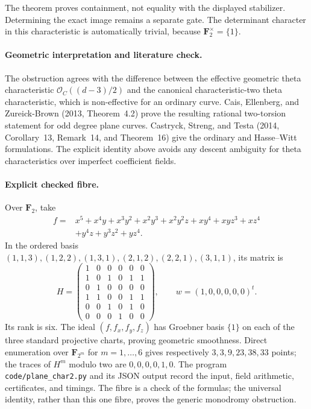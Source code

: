 The theorem proves containment, not equality with the displayed
stabilizer.  Determining the exact image remains a separate gate.
The determinant character in this characteristic is automatically
trivial, because $\mathbf F_2^\times=\{1\}$.

\paragraph{Geometric interpretation and literature check.}
The obstruction agrees with the difference between the effective
geometric theta characteristic
$\mathcal O_C((d-3)/2)$ and the canonical characteristic-two theta
characteristic, which is non-effective for an ordinary curve.
Cais, Ellenberg, and Zureick-Brown (2013, Theorem~4.2) prove the resulting
rational two-torsion statement for odd degree plane curves.
Castryck, Streng, and Testa (2014, Corollary~13, Remark~14, and
Theorem~16) give the ordinary and Hasse--Witt formulations.
The explicit identity above avoids any descent ambiguity for theta
characteristics over imperfect coefficient fields.

\paragraph{Explicit checked fibre.}
Over $\mathbf F_2$, take
\begin{align*}
f={}&x^5+x^4y+x^3y^2+x^2y^3+x^2y^2z+xy^4+xyz^3+xz^4\\
 &+y^4z+y^3z^2+yz^4.
\end{align*}
In the ordered basis
$(1,1,3),(1,2,2),(1,3,1),(2,1,2),(2,2,1),(3,1,1)$, its matrix is
\[
H=\begin{pmatrix}
1&0&0&0&0&0\\1&0&1&0&1&1\\0&1&0&0&0&0\\
1&1&0&0&1&1\\0&0&1&0&1&0\\0&0&0&1&0&0
\end{pmatrix},\qquad w=(1,0,0,0,0,0)^t.
\]
Its rank is six.  The ideal $(f,f_x,f_y,f_z)$ has Groebner basis
$\{1\}$ on each of the three standard projective charts, proving
geometric smoothness.  Direct enumeration over
$\mathbf F_{2^m}$ for $m=1,\ldots,6$ gives respectively
$3,3,9,23,38,33$ points; the traces of $H^m$ modulo two are
$0,0,0,0,1,0$.  The program \texttt{code/plane\_char2.py} and its JSON
output record the input, field arithmetic, certificates, and timings.
The fibre is a check of the formulas; the universal identity, rather
than this one fibre, proves the generic monodromy obstruction.


